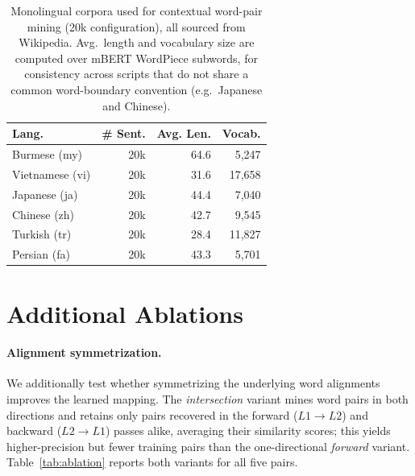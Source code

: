 \documentclass[11pt]{article}
\begin{document}
\begin{table}[h]
\centering
\small
\caption{Monolingual corpora used for contextual word-pair mining (20k configuration), all sourced from Wikipedia. Avg.\ length and vocabulary size are computed over mBERT WordPiece subwords, for consistency across scripts that do not share a common word-boundary convention (e.g.\ Japanese and Chinese).}
\label{tab:mono_dataset}
\setlength{\tabcolsep}{4pt}
\begin{tabular}{lrrr}
\toprule
\textbf{Lang.} & \textbf{\# Sent.} & \textbf{Avg. Len.} & \textbf{Vocab.} \\
\midrule
Burmese (my)    & 20k & 64.6 & 5,247 \\
Vietnamese (vi) & 20k & 31.6 & 17,658 \\
Japanese (ja)   & 20k & 44.4 & 7,040 \\
Chinese (zh)    & 20k & 42.7 & 9,545 \\
Turkish (tr)    & 20k & 28.4 & 11,827 \\
Persian (fa)    & 20k & 43.3 & 5,701 \\
\bottomrule
\end{tabular}
\end{table}

\section{Additional Ablations}
\label{app:ablations}

\paragraph{Alignment symmetrization.} We additionally test whether symmetrizing the underlying word alignments improves the learned mapping. The \emph{intersection} variant mines word pairs in both directions and retains only pairs recovered in the forward ($L1\!\to\!L2$) and backward ($L2\!\to\!L1$) passes alike, averaging their similarity scores; this yields higher-precision but fewer training pairs than the one-directional \emph{forward} variant. Table~\ref{tab:ablation} reports both variants for all five pairs.
\end{document}
